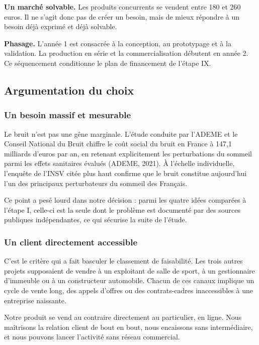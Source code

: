 \textbf{Un marché solvable.} Les produits concurrents se vendent entre 180 et
260 euros. Il ne s'agit donc pas de créer un besoin, mais de mieux répondre à
un besoin déjà exprimé et déjà solvable.

\textbf{Phasage.} L'année 1 est consacrée à la conception, au prototypage et à
la validation. La production en série et la commercialisation débutent en année
2. Ce séquencement conditionne le plan de financement de l'étape IX.

\clearpage

\subsection{Argumentation du choix}

\subsubsection{Un besoin massif et mesurable}

Le bruit n'est pas une gêne marginale. L'étude conduite par l'ADEME et le
Conseil National du Bruit chiffre le coût social du bruit en France à 147,1
milliards d'euros par an, en retenant explicitement les perturbations du
sommeil parmi les effets sanitaires évalués (ADEME, 2021). À l'échelle individuelle, l'enquête
de l'INSV citée plus haut confirme que le bruit constitue aujourd'hui l'un des
principaux perturbateurs du sommeil des Français.

Ce point a pesé lourd dans notre décision : parmi les quatre idées comparées à
l'étape I, celle-ci est la seule dont le problème est documenté par des sources
publiques indépendantes, ce qui sécurise la suite de l'étude.

\subsubsection{Un client directement accessible}

C'est le critère qui a fait basculer le classement de faisabilité. Les trois
autres projets supposaient de vendre à un exploitant de salle de sport, à un
gestionnaire d'immeuble ou à un constructeur automobile. Chacun de ces canaux
implique un cycle de vente long, des appels d'offres ou des contrats-cadres
inaccessibles à une entreprise naissante.

Notre produit se vend au contraire directement au particulier, en ligne. Nous
maîtrisons la relation client de bout en bout, nous encaissons sans
intermédiaire, et nous pouvons lancer l'activité sans réseau commercial.

